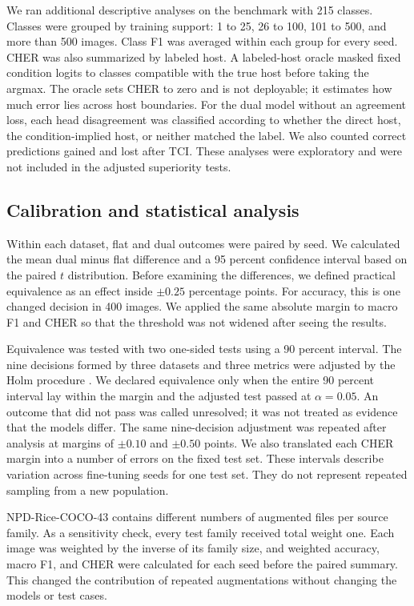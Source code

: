 \documentclass[preprint,12pt]{elsarticle}
\begin{document}
We ran additional descriptive analyses on the benchmark with 215 classes.
Classes were grouped by training support: 1 to 25, 26 to 100, 101 to 500, and
more than 500 images. Class F1 was averaged within each group for every seed.
CHER was also summarized by labeled host. A labeled-host oracle masked fixed
condition logits to classes compatible with the true host before taking the
argmax. The oracle sets CHER to zero and is not deployable; it estimates how
much error lies across host boundaries. For the dual model without an agreement
loss, each head disagreement was classified according to whether the direct
host, the condition-implied host, or neither matched the label. We also counted
correct predictions gained and lost after TCI. These analyses were exploratory
and were not included in the adjusted superiority tests.

\subsection{Calibration and statistical analysis}
\label{sec:statistics}

Within each dataset, flat and dual outcomes were paired by seed. We calculated
the mean dual minus flat difference and a 95 percent confidence interval based
on the paired $t$ distribution. Before examining the differences, we defined
practical equivalence as an effect inside $\pm0.25$ percentage points. For
accuracy, this is one changed decision in 400 images. We applied the same
absolute margin to macro F1 and CHER so that the threshold was not widened after
seeing the results.

Equivalence was tested with two one-sided tests using a 90 percent interval.
The nine decisions formed by three datasets and three metrics were adjusted by
the Holm procedure \cite{lakens2017,holm1979}. We declared equivalence only
when the entire 90 percent interval lay within the margin and the adjusted test
passed at $\alpha=0.05$. An outcome that did not pass was called unresolved;
it was not treated as evidence that the models differ. The same nine-decision
adjustment was repeated after analysis at margins of $\pm0.10$ and $\pm0.50$
points. We also translated each CHER margin into a number of errors on the fixed
test set. These intervals describe variation across fine-tuning seeds for one
test set. They do not represent repeated sampling from a new population.

NPD-Rice-COCO-43 contains different numbers of augmented files per source
family. As a sensitivity check, every test family received total weight one.
Each image was weighted by the inverse of its family size, and weighted
accuracy, macro F1, and CHER were calculated for each seed before the paired
summary. This changed the contribution of repeated augmentations without
changing the models or test cases.
\end{document}

